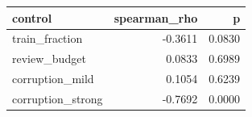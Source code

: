 \begin{tabular}{lrr}
\toprule
          control &  spearman\_rho &      p \\
\midrule
   train\_fraction &       -0.3611 & 0.0830 \\
    review\_budget &        0.0833 & 0.6989 \\
  corruption\_mild &        0.1054 & 0.6239 \\
corruption\_strong &       -0.7692 & 0.0000 \\
\bottomrule
\end{tabular}
